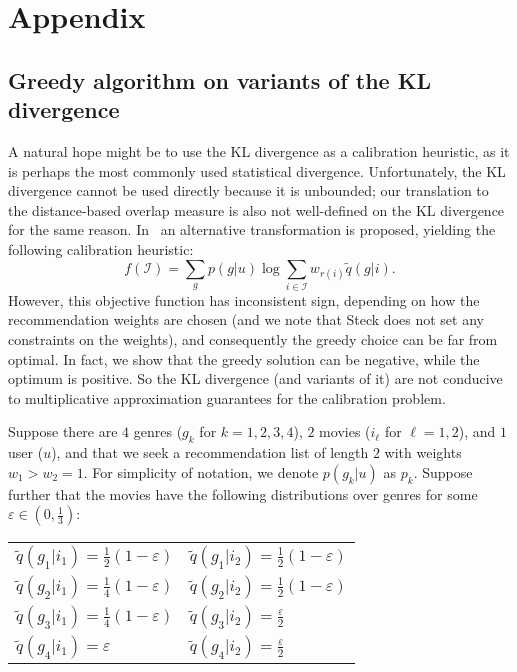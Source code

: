 
% 
\section{Appendix}

\subsection{Greedy algorithm on variants of the KL divergence} \label{sec:bad_netflix}
A natural hope might be to use the KL divergence as a calibration heuristic, as it is perhaps the most commonly used statistical divergence. Unfortunately, the KL divergence cannot be used directly because it is unbounded; our translation to the distance-based overlap measure is also not well-defined on the KL divergence for the same reason. In~\cite{Steck18} an alternative transformation is proposed, yielding the following calibration heuristic: 
$$f(\mathcal{I}) = \sum_g p(g|u) \log \sum_{i \in \mathcal{I}} w_{r(i)} \tilde{q} (g|i).$$
However, this objective function has inconsistent sign, depending on how the recommendation weights are chosen (and we note that Steck does not set any constraints on the weights), and consequently the greedy choice can be far from optimal. In fact, we show that the greedy solution can be negative, while the optimum is positive. So the KL divergence (and variants of it) are not conducive to multiplicative approximation guarantees for the calibration problem.

Suppose there are $4$ genres ($g_k$ for $k=1,2,3,4$), $2$ movies ($i_\ell$ for $\ell=1,2$), and $1$ user ($u$), and that we seek a recommendation list of length $2$ with weights $w_1 > w_2 = 1$. For simplicity of notation, we denote $p(g_k|u)$ as $p_k$. Suppose further that the movies have the following distributions over genres for some $\varepsilon \in (0,\frac{1}{3})$:

\begin{center}
\begin{tabular}{ p{4cm} p{4cm} }
$\tilde{q}(g_1 | i_1) = \frac{1}{2}(1-\varepsilon)$ & $\tilde{q}(g_1 | i_2) = \frac{1}{2}(1-\varepsilon)$ \\[6pt]
$\tilde{q}(g_2 | i_1) = \frac{1}{4}(1-\varepsilon)$ & $\tilde{q}(g_2 | i_2) = \frac{1}{2}(1-\varepsilon)$ \\[6pt]
$\tilde{q}(g_3 | i_1) = \frac{1}{4}(1-\varepsilon)$ & $\tilde{q}(g_3 | i_2) = \frac{\varepsilon}{2}$ \\[6pt]
$\tilde{q}(g_4 | i_1) = \varepsilon$ & $\tilde{q}(g_4 | i_2) = \frac{\varepsilon}{2}$ 
\end{tabular}
\end{center}

